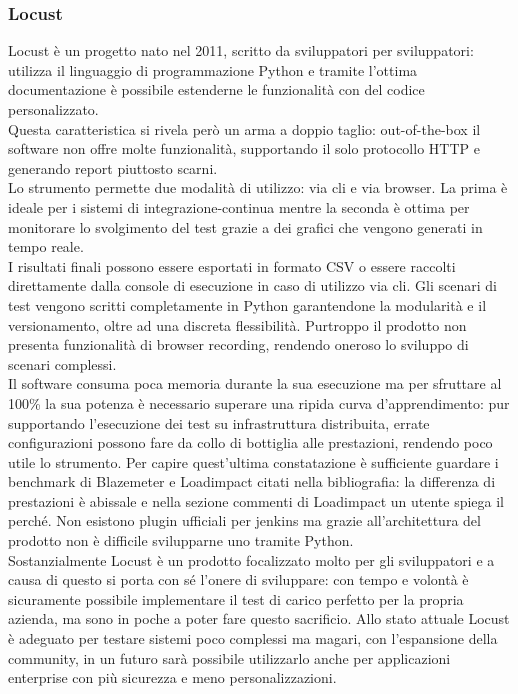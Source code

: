 \subsubsection{Locust}
Locust è un progetto nato nel 2011, scritto da sviluppatori per sviluppatori: utilizza il linguaggio di programmazione Python e tramite l'ottima documentazione è possibile estenderne le funzionalità con del codice personalizzato. \\
Questa caratteristica si rivela però un arma a doppio taglio: \gls{out-of-the-box} il software non offre molte funzionalità, supportando il solo protocollo HTTP e generando report piuttosto scarni.\\
Lo strumento permette due modalità di utilizzo: via \gls{cli} e via browser. La prima è ideale per i sistemi di \gls{integrazione-continua} mentre la seconda è ottima per monitorare lo svolgimento del test grazie a dei grafici che vengono generati in tempo reale. \\
I risultati finali possono essere esportati in formato CSV o essere raccolti direttamente dalla console di esecuzione in caso di utilizzo via \gls{cli}.
Gli scenari di test vengono scritti completamente in Python garantendone la modularità e il versionamento, oltre ad una discreta flessibilità. Purtroppo il prodotto non presenta funzionalità di browser recording, rendendo oneroso lo sviluppo di scenari complessi.\\
Il software consuma poca memoria durante la sua esecuzione ma per sfruttare al 100\% la sua potenza è necessario superare una ripida curva d'apprendimento: pur supportando l'esecuzione dei test su infrastruttura distribuita, errate configurazioni possono fare da collo di bottiglia alle prestazioni, rendendo poco utile lo strumento. Per capire quest'ultima constatazione è sufficiente guardare i benchmark di Blazemeter e Loadimpact citati nella bibliografia: la differenza di prestazioni è abissale e nella sezione commenti di Loadimpact un utente spiega il perché. 
Non esistono plugin ufficiali per jenkins ma grazie all'architettura del prodotto non è difficile svilupparne uno tramite Python. \\
Sostanzialmente Locust è un prodotto focalizzato molto per gli sviluppatori e a causa di questo si porta con sé l’onere di sviluppare: con tempo e volontà è sicuramente possibile implementare il test di carico perfetto per la propria azienda, ma sono in poche a poter fare questo sacrificio.
Allo stato attuale Locust è adeguato per testare sistemi poco complessi ma magari, con l’espansione della community, in un futuro sarà possibile utilizzarlo anche per applicazioni enterprise con più sicurezza e meno personalizzazioni.
